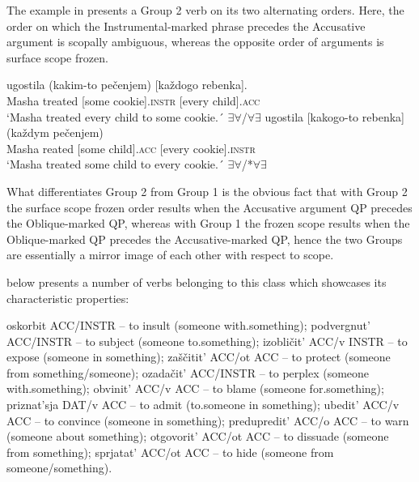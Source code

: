 \documentclass[output=paper,colorlinks,citecolor=brown,nonflat]{./langscibook}
\begin{document}
The example in  presents a Group 2 verb on its two alternating orders. Here, the order on which the Instrumental-marked phrase precedes the Accusative argument is scopally ambiguous, whereas the opposite order of arguments is surface scope frozen.


\ea%
    \label{ex:antonyuk:15}
    \ea \label{ex:antonyuk:15a}
       {ugostila} {(kakim-to} {pečenjem)}  {[každogo} {rebenka]}.\\
    Masha treated  [some        cookie].\textsc{instr} [every child].\textsc{acc}\\
    \glt `Masha treated every child to some cookie.´ \hfill ${\exists}{\forall}$/${\forall}{\exists}$
    \ex \label{ex:antonyuk:15b}
       {ugostila} {[kakogo-to} {rebenka]}    {(každym} {pečenjem)}\\
    Masha reated    [some child].\textsc{acc} [every    cookie].\textsc{instr}\\
    \glt `Masha treated some child to every cookie.´ \hfill ${\exists}{\forall}$/*${\forall}{\exists}$
    \z
\z

What differentiates Group 2 from Group 1 is the obvious fact that with Group 2 the surface scope frozen order results when the Accusative argument QP precedes the Oblique-marked QP, whereas with Group 1 the frozen scope results when the Oblique-marked QP precedes the Accusative-marked QP, hence the two Groups are essentially a mirror image of each other with respect to scope.

 below presents a number of verbs belonging to this class which showcases its characteristic properties:

\ea%
    \label{ex:antonyuk:16}
    \ea \label{ex:antonyuk:16a}
    oskorbit ACC/INSTR – to insult (someone with.something);
    \ex \label{ex:antonyuk:16b}
    podvergnut’ ACC/INSTR – to subject (someone to.something);
    \ex \label{ex:antonyuk:16c}
    izobličit’ ACC/v INSTR – to expose (someone in something);
    \ex \label{ex:antonyuk:16d}
    zaščitit’ ACC/ot ACC – to protect (someone from something/someone);
    \ex \label{ex:antonyuk:16e}
    ozadačit’ ACC/INSTR – to perplex (someone with.something);
    \ex \label{ex:antonyuk:16f}
    obvinit’ ACC/v ACC – to blame (someone for.something);
    \ex \label{ex:antonyuk:16g}
    priznat’sja DAT/v ACC – to admit (to.someone in something);
    \ex \label{ex:antonyuk:16h}
    ubedit’ ACC/v ACC – to convince (someone in something);
    \ex \label{ex:antonyuk:16i}
    predupredit’ ACC/o ACC – to warn (someone about something);
    \ex \label{ex:antonyuk:16j}
    otgovorit’ ACC/ot ACC – to dissuade (someone from something);
    \ex \label{ex:antonyuk:16k}
    sprjatat’ ACC/ot ACC – to hide (someone from someone/something).
    \z
\z
\end{document}
